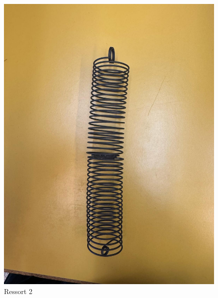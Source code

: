 \begin{figure}[h]
\begin{minipage}{0.32\textwidth}
                    \includegraphics[width=\linewidth]{images/res1.jpeg}
                    \caption{Ressort 2}
                \end{minipage}
                \hfill
                \begin{minipage}{0.32\textwidth}
                    \centering

\end{minipage}
\end{figure}
